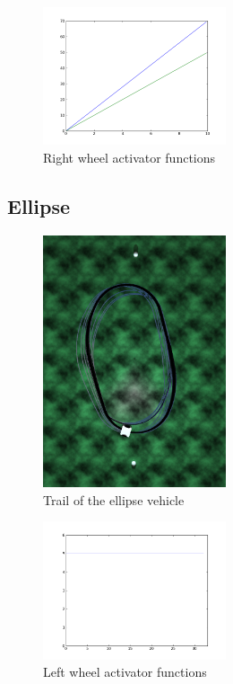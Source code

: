 \documentclass[a4paper]{article}
\begin{document}
\begin{figure}
	\begin{center}
		\includegraphics[width=0.48\textwidth]{graphs/activators/eight_r.png}
	\end{center}
	\caption{Right wheel activator functions}
\end{figure}

\subsection{Ellipse}
\begin{figure}
	\begin{center}
		\includegraphics[width=0.48\textwidth]{trail/ellipse.png}
	\end{center}
	\caption{Trail of the ellipse vehicle}
\end{figure}

\begin{figure}
	\begin{center}
		\includegraphics[width=0.48\textwidth]{graphs/activators/ellipse_l.png}
	\end{center}
	\caption{Left wheel activator functions}
\end{figure}
\end{document}
